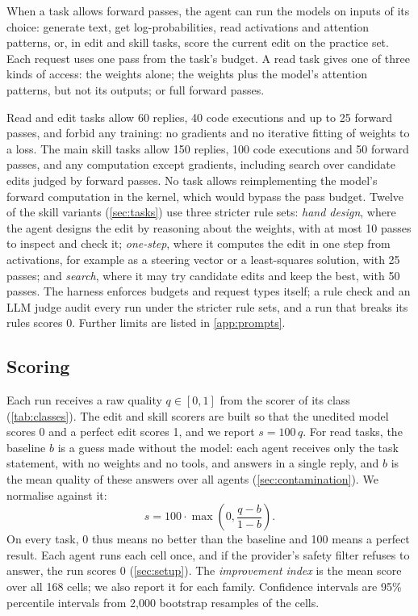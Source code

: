 \documentclass[11pt]{article}
\begin{document}
When a task allows forward passes, the agent can run the models on inputs of its choice: generate
text, get log-probabilities, read activations and attention patterns, or, in edit and skill
tasks, score the current edit on the practice set. Each request uses one pass from the task's
budget. A read task gives one of three kinds of access: the weights alone; the weights plus the
model's attention patterns, but not its outputs; or full forward passes.

Read and edit tasks allow 60 replies, 40 code executions and up to 25 forward passes, and forbid
any training: no gradients and no iterative fitting of weights to a loss. The main skill tasks
allow 150 replies, 100 code executions and 50 forward passes, and any computation except
gradients, including search over candidate edits judged by forward passes. No task allows
reimplementing the model's forward computation in the kernel, which would bypass the pass budget.
Twelve of the skill variants (\cref{sec:tasks}) use three stricter rule sets: \emph{hand design}, where the
agent designs the edit by reasoning about the weights, with at most 10 passes to inspect and check
it; \emph{one-step}, where it computes the edit in one step from activations, for example as a
steering vector or a least-squares solution, with 25 passes; and \emph{search}, where it may try
candidate edits and keep the best, with 50 passes. The harness enforces budgets and request types
itself; a rule check and an LLM judge audit every run under the stricter rule sets, and a run that
breaks its rules scores 0. Further limits are listed in \cref{app:prompts}.

\subsection{Scoring}\label{sec:scoring}

Each run receives a raw quality $q \in [0, 1]$ from the scorer of its class
(\cref{tab:classes}). The edit and skill scorers are built so that the unedited model scores 0
and a perfect edit scores 1, and we report $s = 100\,q$. For read tasks, the baseline $b$ is a
guess made without the model: each agent receives only the task statement, with no weights and
no tools, and answers in a single reply, and $b$ is the mean quality of these answers over all
agents (\cref{sec:contamination}). We normalise against it:
\[
  s = 100 \cdot \max\!\left(0, \frac{q - b}{1 - b}\right).
\]
On every task, 0 thus means no better than the baseline and 100 means a perfect result. Each agent runs each cell once, and
if the provider's safety filter refuses to answer, the run scores 0 (\cref{sec:setup}). The
\emph{improvement index} is the mean score over all 168 cells; we also report it for each
family. Confidence intervals are 95\% percentile intervals from 2,000
bootstrap resamples of the cells.
\end{document}
